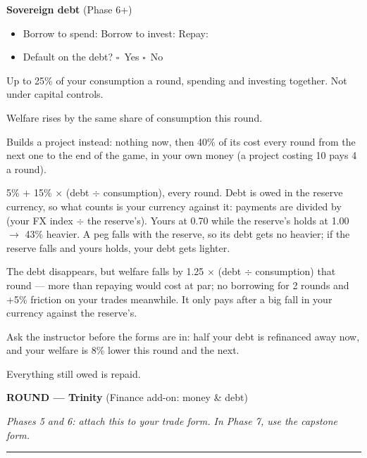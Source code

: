 \documentclass[11pt]{article}
\newcommand{\blank}[1]{\underline{\hspace{#1}}}
\newcommand{\boxx}{$\square$}
\newcommand{\hr}{\par\vspace{2pt}\noindent\rule{\linewidth}{0.4pt}\par\vspace{2pt}}
\begin{document}
\vspace{4pt}
{\bfseries Sovereign debt} (Phase 6+)\par
\begin{itemize}[nosep,leftmargin=1.4em]
  \item Borrow to spend: \blank{2.2cm} \quad Borrow to invest: \blank{2.2cm} \quad Repay: \blank{2.2cm}
  \item Default on the debt? \quad \boxx\ Yes \quad \boxx\ No
\end{itemize}
{\small
\begin{description}[nosep,style=sameline,leftmargin=5.6em,font=\normalfont\bfseries]
  \item[Borrow] Up to 25\% of your consumption a round, spending and investing together. Not under capital controls.
  \item[Spend] Welfare rises by the same share of consumption this round.
  \item[Invest] Builds a project instead: nothing now, then 40\% of its cost every round from the next one to the end of the game, in your own money (a project costing 10 pays 4 a round).
  \item[Interest] 5\% + 15\% $\times$ (debt $\div$ consumption), every round. Debt is owed in the reserve currency, so what counts is your currency against it: payments are divided by (your FX index $\div$ the reserve's). Yours at 0.70 while the reserve's holds at 1.00 $\to$ 43\% heavier. A peg falls with the reserve, so its debt gets no heavier; if the reserve falls and yours holds, your debt gets lighter.
  \item[Default] The debt disappears, but welfare falls by 1.25 $\times$ (debt $\div$ consumption) that round --- more than repaying would cost at par; no borrowing for 2 rounds and +5\% friction on your trades meanwhile. It only pays after a big fall in your currency against the reserve's.
  \item[IMF] Ask the instructor before the forms are in: half your debt is refinanced away now, and your welfare is 8\% lower this round and the next.
  \item[Last round] Everything still owed is repaid.
\end{description}}

\newpage

{\large\bfseries ROUND \blank{1cm} --- Trinity} \hfill (Finance add-on: money \& debt)\par
\textit{Phases 5 and 6: attach this to your trade form. In Phase 7, use the capstone form.}
\hr
\end{document}
